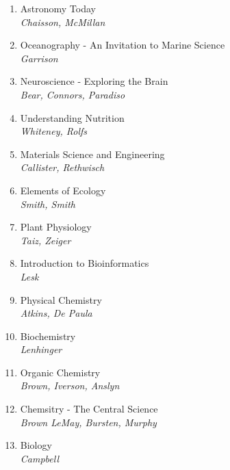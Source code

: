 \documentclass[oneside, titlepage]{article}
\begin{document}
\begin{enumerate}
\item{Astronomy Today\\ \itshape Chaisson, McMillan}

\item{Oceanography - An Invitation to Marine Science\\ \itshape Garrison}

\item{Neuroscience - Exploring the Brain\\ \itshape Bear, Connors, Paradiso}

\item{Understanding Nutrition\\ \itshape Whiteney, Rolfs}

\item{Materials Science and Engineering\\ \itshape Callister, Rethwisch}

\item{Elements of Ecology\\ \itshape Smith, Smith}

\item{Plant Physiology\\ \itshape Taiz, Zeiger}

\item{Introduction to Bioinformatics\\ \itshape Lesk}

\item{Physical Chemistry\\ \itshape Atkins, De Paula}

\item{Biochemistry\\ \itshape Lenhinger}

\item{Organic Chemistry\\ \itshape Brown, Iverson, Anslyn}

\item{Chemsitry - The Central Science\\ \itshape Brown LeMay, Bursten, Murphy}

\item{Biology\\ \itshape Campbell}


\end{enumerate}
\end{document}
